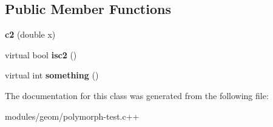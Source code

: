 \subsection*{Public Member Functions}
\begin{DoxyCompactItemize}
\item 
\hypertarget{classc2_a524daf4971a05e02f5be0cc83366a063}{{\bfseries c2} (double x)}\label{classc2_a524daf4971a05e02f5be0cc83366a063}

\item 
\hypertarget{classc2_a22350ff2a288d6cb03ff27bdafaf815a}{virtual bool {\bfseries isc2} ()}\label{classc2_a22350ff2a288d6cb03ff27bdafaf815a}

\item 
\hypertarget{classc2_a14e540c8832b8a2fe41770012e6d3ab9}{virtual int {\bfseries something} ()}\label{classc2_a14e540c8832b8a2fe41770012e6d3ab9}

\end{DoxyCompactItemize}


The documentation for this class was generated from the following file\-:\begin{DoxyCompactItemize}
\item 
modules/geom/polymorph-\/test.\-c++\end{DoxyCompactItemize}
